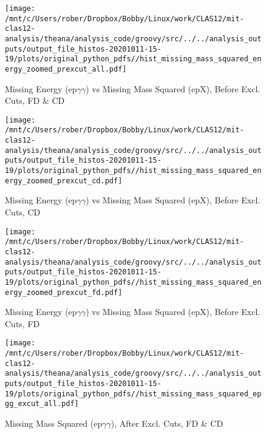 \documentclass{article}
\begin{document}
\begin{landscape}
    \begin{figure}[h]
        \centering

        \texttt{[image: /mnt/c/Users/rober/Dropbox/Bobby/Linux/work/CLAS12/mit-clas12-analysis/theana/analysis\_code/groovy/src/../../analysis\_outputs/output\_file\_histos-20201011-15-19/plots/original\_python\_pdfs//hist\_missing\_mass\_squared\_energy\_zoomed\_prexcut\_all.pdf]}
        \captionsetup{textformat=empty,labelformat=blank}
        \caption{Missing Energy (ep$\gamma$$\gamma$) vs Missing Mass Squared (epX), Before Excl. Cuts, FD \& CD}
    \end{figure}
    \clearpage
    
    \begin{figure}[h]
        \centering

        \texttt{[image: /mnt/c/Users/rober/Dropbox/Bobby/Linux/work/CLAS12/mit-clas12-analysis/theana/analysis\_code/groovy/src/../../analysis\_outputs/output\_file\_histos-20201011-15-19/plots/original\_python\_pdfs//hist\_missing\_mass\_squared\_energy\_zoomed\_prexcut\_cd.pdf]}
        \captionsetup{textformat=empty,labelformat=blank}
        \caption{Missing Energy (ep$\gamma$$\gamma$) vs Missing Mass Squared (epX), Before Excl. Cuts, CD}
    \end{figure}
    \clearpage
    
    \begin{figure}[h]
        \centering

        \texttt{[image: /mnt/c/Users/rober/Dropbox/Bobby/Linux/work/CLAS12/mit-clas12-analysis/theana/analysis\_code/groovy/src/../../analysis\_outputs/output\_file\_histos-20201011-15-19/plots/original\_python\_pdfs//hist\_missing\_mass\_squared\_energy\_zoomed\_prexcut\_fd.pdf]}
        \captionsetup{textformat=empty,labelformat=blank}
        \caption{Missing Energy (ep$\gamma$$\gamma$) vs Missing Mass Squared (epX), Before Excl. Cuts, FD}
    \end{figure}
    \clearpage
    
    \begin{figure}[h]
        \centering

        \texttt{[image: /mnt/c/Users/rober/Dropbox/Bobby/Linux/work/CLAS12/mit-clas12-analysis/theana/analysis\_code/groovy/src/../../analysis\_outputs/output\_file\_histos-20201011-15-19/plots/original\_python\_pdfs//hist\_missing\_mass\_squared\_epgg\_excut\_all.pdf]}
        \captionsetup{textformat=empty,labelformat=blank}
        \caption{Missing Mass Squared (ep$\gamma$$\gamma$), After Excl. Cuts, FD \& CD}
    \end{figure}
    \clearpage
    

\end{landscape}
\end{document}
